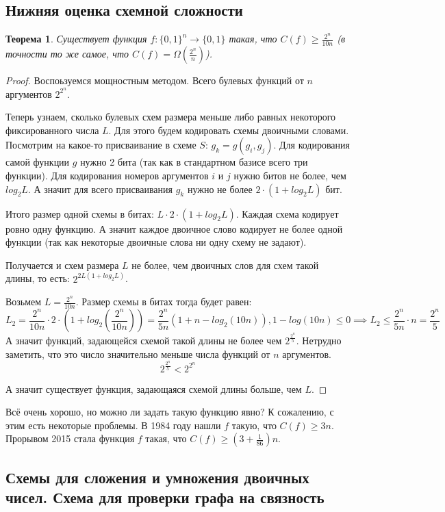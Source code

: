 \documentclass[a4paper, 12pt]{article}
\newtheorem*{existsFgthen2ndivn}{Теорема}
\begin{document}
\subsection*{Нижняя оценка схемной сложности}
\begin{existsFgthen2ndivn}
    Существует функция $f: \{0, 1\}^n \rightarrow \{0, 1\}$
    такая, что $C(f) \geqslant \frac{2^n}{10n}$ 
    (в точности то же самое, что $C(f) = \Omega(\frac{2^n}{n})$).
\end{existsFgthen2ndivn}
\begin{proof}
    Воспоьзуемся мощностным методом. Всего булевых функций от $n$ аргументов $2^{2^n}$.

    Теперь узнаем, сколько булевых схем размера меньше либо равных некоторого фиксированного
    числа $L$. Для этого будем кодировать схемы двоичными словами. Посмотрим на 
    какое-то присваивание в схеме $S$: $g_k = g(g_i, g_j)$. Для кодирования
    самой функции $g$ нужно 2 бита (так как в стандартном базисе всего три функции).
    Для кодирования номеров аргументов $i$ и $j$ нужно битов не более, чем $log_2L$.
    А значит для всего присваивания $g_k$ нужно не более $2 \cdot (1 + log_2L)$ бит.

    Итого размер одной схемы в битах: $L \cdot 2 \cdot (1 + log_2L)$. Каждая схема
    кодирует ровно одну функцию. А значит каждое двоичное слово кодирует не более 
    одной функции (так как некоторые двоичные слова ни одну схему не задают).

    Получается и схем размера $L$ не более, чем двоичных слов для схем такой длины,
    то есть: $2^{2L(1 + log_2L)}$.

    Возьмем $L = \frac{2^n}{10n}$. Размер схемы в битах тогда будет равен: 
    \[
    L_2 = \frac{2^n}{10n} \cdot 2 \cdot \left(1 + log_2\left( \frac{2^n}{10n} \right)\right) = 
    \frac{2^n}{5n} \left( 1 + n - log_2(10n) \right), 1 - log(10n) \leqslant 0 \implies
    L_2 \leqslant \frac{2^n}{5n}\cdot n = \frac{2^n}{5}
    \]
    А значит функций, задающейся схемой такой длины не более чем $2^{\frac{2^n}{5}}$.
    Нетрудно заметить, что это число значительно меньше числа функций от $n$ аргументов.
    \[
        2^{\frac{2^n}{5}} < 2^{2^n}
    \]

    А значит существует функция, задающаяся схемой длины больше, чем $L$.
\end{proof}

Всё очень хорошо, но можно ли задать такую функцию явно? К сожалению, с этим есть
некоторые проблемы. В 1984 году нашли $f$ такую, что $C(f) \geqslant 3n$.
Прорывом 2015 стала функция $f$ такая, что 
$C(f) \geqslant \left( 3 + \frac{1}{86} \right)n$.

\subsection*{Схемы для сложения и умножения двоичных чисел. Схема для проверки графа на связность}
\end{document}
